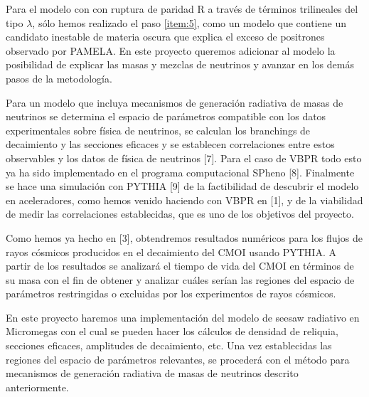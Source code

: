 \begin{proyecto}
  Para el modelo con con ruptura de paridad R a través de términos
  trilineales del tipo $\lambda$, sólo hemos realizado el paso
  \ref{item:5}, como un modelo que contiene un candidato inestable de
  materia oscura que explica el exceso de positrones observado por
  PAMELA. En este proyecto queremos adicionar al modelo la posibilidad
  de explicar las masas y mezclas de neutrinos y avanzar en los demás
  pasos de la metodología.
\end{proyecto}





\begin{ideas}
  

Para un modelo que incluya mecanismos de generación radiativa de masas de neutrinos se determina el espacio de parámetros compatible con los datos experimentales sobre física de neutrinos, se calculan los branchings de decaimiento y las secciones eficaces y se establecen correlaciones entre estos observables y los datos de física de neutrinos [7]. Para el caso de VBPR todo esto ya ha sido implementado en el programa computacional SPheno [8]. Finalmente se hace una simulación con PYTHIA [9] de la factibilidad de descubrir el modelo en aceleradores, como hemos venido haciendo con VBPR en [1], y de la viabilidad de medir las correlaciones establecidas, que es uno de los objetivos del proyecto.

Como hemos ya hecho en [3], obtendremos resultados numéricos para los flujos de rayos cósmicos  producidos en el decaimiento del CMOI usando PYTHIA. A partir de los resultados se analizará el tiempo de vida del CMOI  en términos de su masa con el fin de obtener y analizar cuáles serían las regiones del espacio de parámetros restringidas o excluidas por los experimentos de rayos cósmicos.

En este proyecto haremos una implementación del modelo de seesaw radiativo en Micromegas  con el cual se pueden hacer los cálculos de densidad de reliquia, secciones eficaces, amplitudes de decaimiento, etc. Una vez establecidas las regiones del espacio de parámetros relevantes, se procederá con el método para mecanismos de generación radiativa de masas de neutrinos descrito anteriormente.
\end{ideas}

